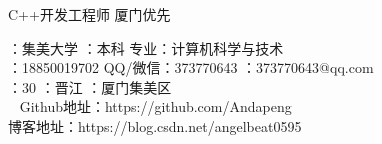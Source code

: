 \documentclass{resume} %
\begin{document}

\begin{rSection}{}
	C++开发工程师 \qquad\faBuildingO 厦门优先 \\
\end{rSection}


\begin{rSection}{}
	：集美大学 \qquad \qquad{}：本科 \qquad \quad 专业：计算机科学与技术\\
	\qquad {}：18850019702 \qquad \faComments QQ/微信：373770643  \qquad {}：373770643@qq.com \\
	：30 \qquad {}：晋江	\qquad {}：厦门集美区 \\
     \faGithubAlt~ Github地址：https://github.com/Andapeng\\
	\faLink 博客地址：https://blog.csdn.net/angelbeat0595
	
	
\end{rSection}


\end{document}
